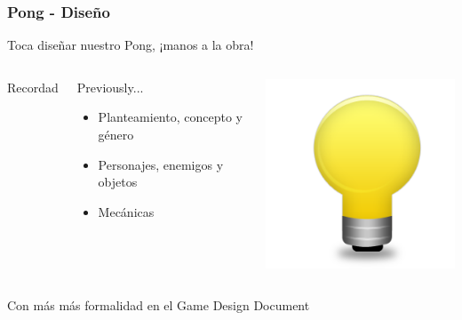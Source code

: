 \begin{frame}
	\frametitle{Pong - Diseño}
	
	\begin{center}
	Toca diseñar nuestro Pong, ¡manos a la obra!
	\end{center}
	
	\begin{columns}[c]
	\column{175pt}
		
	Recordad	
	
	\begin{block}{Previously...}
		\begin{itemize}
			\item Planteamiento, concepto y género
			\item Personajes, enemigos y objetos
			\item Mecánicas
		\end{itemize}            
	\end{block}
	
	\column{125pt}
	
	\begin{center}
		\includegraphics[scale=0.3]{img/Lamp-256.png}
	\end{center}	
	
	\end{columns}
	
	\begin{center}
	Con más más formalidad en el Game Design Document
	\end{center}
	
\end{frame}

